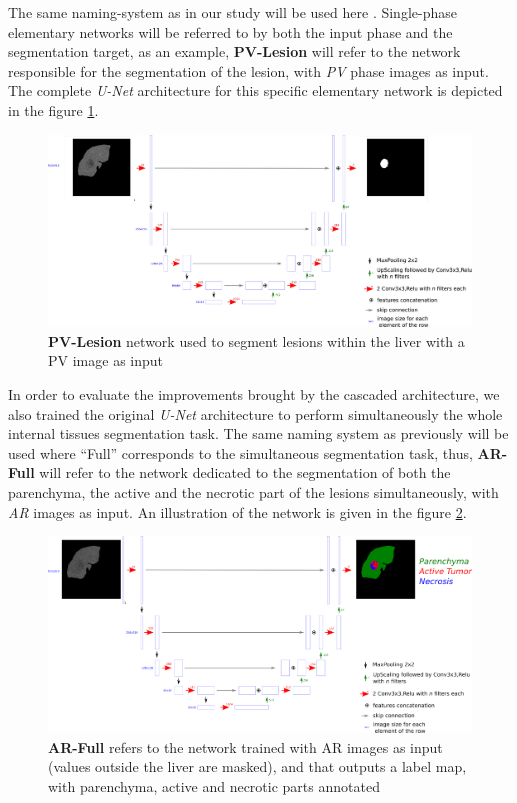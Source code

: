 \documentclass[]{article}
\newcommand{\pplfont}[1]{{\textbf{\fontfamily{ppl}\selectfont #1}}}
\begin{document}
	The same naming-system as in our study will be used
	here \cite{Ouhmich2019}. Single-phase elementary networks will be referred to by both the
	input phase and the segmentation target, as an example, \pplfont{PV-Lesion} will
	refer to the network responsible for the segmentation of the lesion,
	with \emph{PV} phase images as input. The complete \emph{U-Net}
	architecture for this specific elementary network is depicted in the figure \ref{CARS_PV_lesion_Fig}.
	
	\begin{figure}[th!]
		\centering
		\includegraphics[width=0.9\linewidth]{images/image16}
		\caption{\pplfont{PV-Lesion} network used to segment lesions within the liver with a PV image as input}
		\label{CARS_PV_lesion_Fig}
	\end{figure}
	
	
	In order to evaluate the improvements brought by the cascaded
	architecture, we also trained the original \emph{U-Net} architecture to
	perform simultaneously the whole internal tissues segmentation task. The
	same naming system as previously will be used where ``Full'' corresponds
	to the simultaneous segmentation task, thus, \pplfont{AR-Full} will refer to the
	network dedicated to the segmentation of both the parenchyma, the active
	and the necrotic part of the lesions simultaneously, with \emph{AR}
	images as input. An illustration of the network is given in the figure
	\ref{CARS_ArFull_Fig}.
	
	\begin{figure}[th!]
		\centering
		\includegraphics[width=0.9\linewidth]{images/image23}
		\caption{\pplfont{AR-Full} refers to the network trained with AR images as input (values outside the liver are masked), and that outputs a label map, with parenchyma, active and necrotic parts annotated}
		\label{CARS_ArFull_Fig}
	\end{figure}
	
\end{document}
